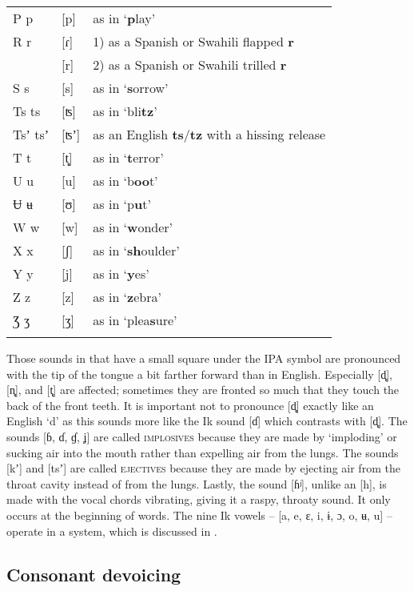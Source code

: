 \begin{table}
\begin{tabularx}{\textwidth}{llX}
P p & [p] & as in ‘\textbf{p}lay’\\
R r & [ɾ] & 1) as a Spanish or Swahili flapped \textbf{r}\\
& [r] & 2) as a Spanish or Swahili trilled \textbf{r}\\
S s & [s] & as in ‘\textbf{s}orrow’\\
Ts ts & [ʦ] & as in ‘bli\textbf{tz}’\\
Tsʼ tsʼ & [ʦʼ] & as an English \textbf{ts}/\textbf{tz} with a hissing release\\
T t & [t̻] & as in ‘\textbf{t}error’\\
U u & [u] & as in ‘b\textbf{oo}t’\\
Ʉ ʉ & [ʊ] & as in ‘p\textbf{u}t’\\
W w & [w] & as in ‘\textbf{w}onder’\\
X x & [ʃ] & as in ‘\textbf{sh}oulder’\\
Y y & [j] & as in ‘\textbf{y}es’\\
Z z & [z] & as in ‘\textbf{z}ebra’\\
Ʒ ʒ & [ʒ] & as in ‘plea\textbf{s}ure’\\
\lspbottomrule
\end{tabularx}

\end{table}

Those sounds in  that have a small square under the IPA symbol are pronounced with the tip of the tongue a bit farther forward than in English. Especially [d̻], [n̻], and [t̻] are affected; sometimes they are fronted so much that they touch the back of the front teeth. It is important not to pronounce [d̻] exactly like an English ‘d’ as this sounds more like the Ik sound [ɗ] which contrasts with [d̻]. The sounds [ɓ, ɗ, ɠ, ʝ] are called \textsc{implosives} because they are made by ‘imploding’ or sucking air into the mouth rather than expelling air from the lungs. The sounds [kʼ] and [tsʼ] are called \textsc{ejectives} because they are made by ejecting air from the throat cavity instead of from the lungs. Lastly, the sound [ɦʲ], unlike an [h], is made with the vocal chords vibrating, giving it a raspy, throaty sound. It only occurs at the beginning of words. The nine Ik vowels – [a, e, ɛ, i, ɨ, ɔ, o, ʉ, u] – operate in a  system, which is discussed in .
 
\subsection{Consonant devoicing}\label{sec:2.2}


